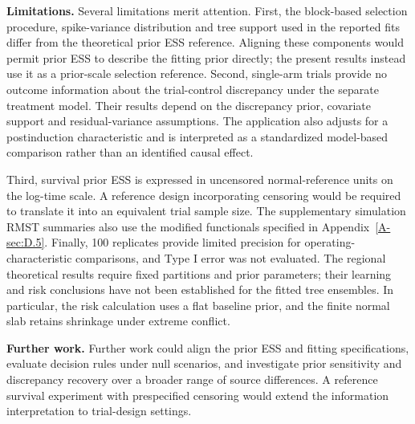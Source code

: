 \documentclass[11pt]{article}
\begin{document}
\noindent\textbf{Limitations.}
Several limitations merit attention. First, the block-based selection procedure, spike-variance distribution and tree support used in the reported fits differ from the theoretical prior ESS reference. Aligning these components would permit prior ESS to describe the fitting prior directly; the present results instead use it as a prior-scale selection reference. Second, single-arm trials provide no outcome information about the trial-control discrepancy under the separate treatment model. Their results depend on the discrepancy prior, covariate support and residual-variance assumptions. The application also adjusts for a postinduction characteristic and is interpreted as a standardized model-based comparison rather than an identified causal effect.

Third, survival prior ESS is expressed in uncensored normal-reference units on the log-time scale. A reference design incorporating censoring would be required to translate it into an equivalent trial sample size. The supplementary simulation RMST summaries also use the modified functionals specified in Appendix~\ref{A-sec:D.5}. Finally, 100 replicates provide limited precision for operating-characteristic comparisons, and Type I error was not evaluated. The regional theoretical results require fixed partitions and prior parameters; their learning and risk conclusions have not been established for the fitted tree ensembles. In particular, the risk calculation uses a flat baseline prior, and the finite normal slab retains shrinkage under extreme conflict.

\noindent\textbf{Further work.}
Further work could align the prior ESS and fitting specifications, evaluate decision rules under null scenarios, and investigate prior sensitivity and discrepancy recovery over a broader range of source differences. A reference survival experiment with prespecified censoring would extend the information interpretation to trial-design settings.



\end{document}
